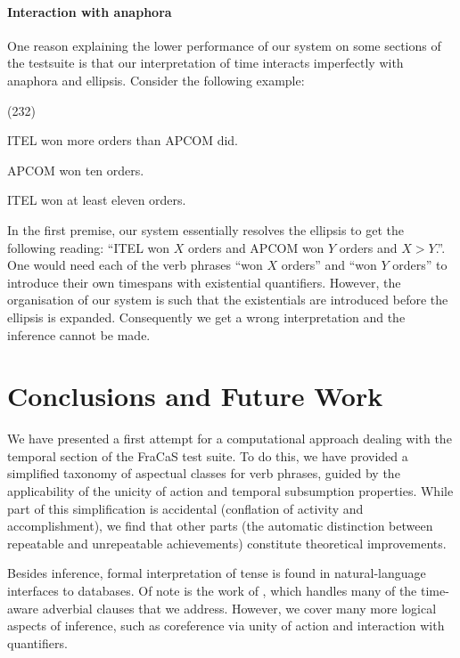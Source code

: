 \documentclass[11pt,a4paper]{article}
\newcommand\hyp{\item[H]}
\newcommand\fracasex[2]{\begin{lingex}\item[(#1)] \begin{subex} #2 \end{subex} \end{lingex} }
\begin{document}
\paragraph{Interaction with anaphora}
\label{sec:interaction-with-anaphora}
One reason explaining the lower performance of our system on some
sections of the testsuite is that our interpretation of time interacts
imperfectly with anaphora and ellipsis. Consider the following example:

\fracasex{232}
{\item	ITEL won more orders than APCOM did.
\item	APCOM won ten orders.
\hyp 	ITEL won at least eleven orders.
}

In the first premise, our system essentially resolves the ellipsis to
get the following reading: ``ITEL won \(X\) orders and APCOM won \(Y\) orders
and $X > Y$.''. One would need each of the verb phrases ``won \(X\) orders''
and ``won $Y$ orders'' to introduce their own timespans with existential
quantifiers. However, the organisation of our system is such that the
existentials are introduced before the ellipsis is
expanded. Consequently we get a wrong interpretation and the inference
cannot be made.


\section{Conclusions and Future Work}
\label{sec:conclusion}

We have presented a first attempt for a computational approach dealing
with the temporal section of the FraCaS test suite. To do this, we
have provided a simplified taxonomy of aspectual classes for verb
phrases, guided by the applicability of the unicity of action and
temporal subsumption properties. While part of this simplification is
accidental (conflation of activity and accomplishment), we find that
other parts (the automatic distinction between repeatable and
unrepeatable achievements) constitute theoretical improvements.

Besides inference, formal interpretation of tense is found in
natural-language interfaces to databases. Of note is the work of
\citet{androutsopoulos1998time}, which handles many of the time-aware
adverbial clauses that we address. However, we cover many more
 logical aspects of inference, such as coreference via
unity of action and interaction with quantifiers.
\end{document}
